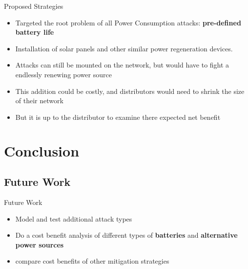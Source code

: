 \documentclass{beamer}
\begin{document}
\begin{frame}{Proposed Strategies}

\begin{itemize}

	\item Targeted the root problem of all Power Consumption attacks: \textbf{pre-defined battery life}
	\item Installation of solar panels and other similar power regeneration devices.
	\item Attacks can still be mounted on the network, but would have to fight a endlessly renewing power source 
	\item This addition could be costly, and distributors would need to shrink the size of their network
	\item But it is up to the distributor to examine there expected net benefit
	
\end{itemize}

\end{frame}

\section{Conclusion}

\subsection{Future Work}
\begin{frame}{Future Work}
\begin{itemize}

	\item Model and test additional attack types 
	\item Do a cost benefit analysis of different types of \textbf{batteries} and \textbf{alternative power sources}
	\item compare cost benefits of other mitigation strategies 

\end{itemize}
\end{frame}	
\end{document}
